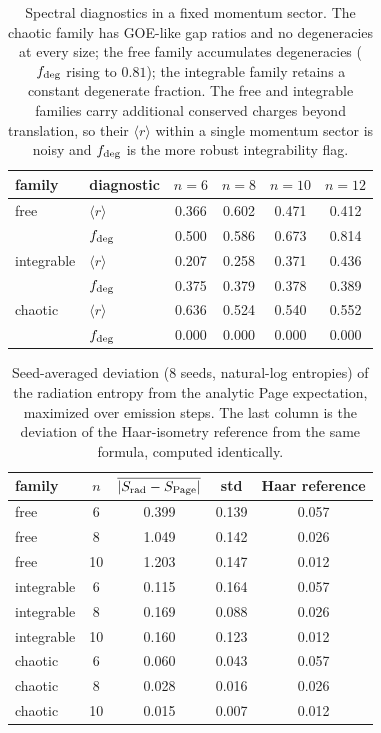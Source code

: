\documentclass[12pt]{article}
\begin{document}
\begin{table}[H]
\centering
\small
\begin{tabular}{llcccc}
\toprule
family & diagnostic & $n=6$ & $n=8$ & $n=10$ & $n=12$ \\
\midrule
free       & $\langle r\rangle$ & 0.366 & 0.602 & 0.471 & 0.412 \\
           & $f_{\rm deg}$      & 0.500 & 0.586 & 0.673 & 0.814 \\
integrable & $\langle r\rangle$ & 0.207 & 0.258 & 0.371 & 0.436 \\
           & $f_{\rm deg}$      & 0.375 & 0.379 & 0.378 & 0.389 \\
chaotic    & $\langle r\rangle$ & 0.636 & 0.524 & 0.540 & 0.552 \\
           & $f_{\rm deg}$      & 0.000 & 0.000 & 0.000 & 0.000 \\
\bottomrule
\end{tabular}
\caption{Spectral diagnostics in a fixed momentum sector.  The chaotic family
has GOE-like gap ratios and no degeneracies at every size; the free family
accumulates degeneracies ($f_{\rm deg}$ rising to $0.81$); the integrable
family retains a constant degenerate fraction.  The free and integrable
families carry additional conserved charges beyond translation, so their
$\langle r\rangle$ within a single momentum sector is noisy and $f_{\rm deg}$
is the more robust integrability flag.}
\label{tab:cayley-diagnostics}
\end{table}

\begin{table}[H]
\centering
\small
\begin{tabular}{lcccc}
\toprule
family & $n$ &
$\overline{|S_{\rm rad}-S_{\rm Page}|}$ & std &
Haar reference \\
\midrule
free       & 6  & 0.399 & 0.139 & 0.057 \\
free       & 8  & 1.049 & 0.142 & 0.026 \\
free       & 10 & 1.203 & 0.147 & 0.012 \\
integrable & 6  & 0.115 & 0.164 & 0.057 \\
integrable & 8  & 0.169 & 0.088 & 0.026 \\
integrable & 10 & 0.160 & 0.123 & 0.012 \\
chaotic    & 6  & 0.060 & 0.043 & 0.057 \\
chaotic    & 8  & 0.028 & 0.016 & 0.026 \\
chaotic    & 10 & 0.015 & 0.007 & 0.012 \\
\bottomrule
\end{tabular}
\caption{Seed-averaged deviation (8 seeds, natural-log entropies) of the
radiation entropy from the analytic Page expectation, maximized over emission
steps.  The last column is the deviation of the Haar-isometry reference from
the same formula, computed identically.}
\label{tab:cayley-scaling}
\end{table}
\end{document}
